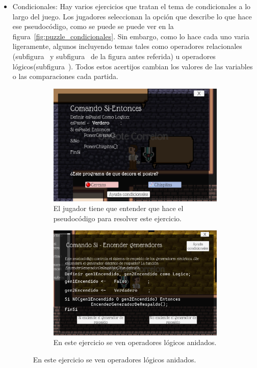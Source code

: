 \begin{itemize}
    \item Condicionales: Hay varios ejercicios que tratan el tema de condicionales a lo largo del juego. Los jugadores seleccionan la opción que describe lo que hace ese pseudocódigo, como se puede se puede ver en la figura~\ref{fig:puzzle_condicionales}. Sin embargo, como lo hace cada uno varia ligeramente, algunos incluyendo temas tales como operadores relacionales (subfigura~ y subfigura~ de la figura antes referida) u operadores lógicos(subfigura~). Todos estos acertijos cambian los valores de las variables o las comparaciones cada partida.
    \begin{figure}[H]
        \centering
        \caption{Capturas de pantalla de los diversos ejercicios de condicionales en el juego.}
        \label{fig:puzzle_condicionales}
        \begin{subfigure}{\textwidth}
            \centering
            \includegraphics[width=0.5\linewidth]{images/Puzzlecondicional1.png}
            \caption{El jugador tiene que entender que hace el pseudocódigo para resolver este ejercicio.}
            \label{fig:puzzle_condicionales1}
        \end{subfigure}
        \begin{subfigure}{\textwidth}
            \centering
            \includegraphics[width=0.5\linewidth]{images/Puzzlecondicional2.png}
            \caption{En este ejercicio se ven operadores lógicos anidados.}
            \label{fig:puzzle_condicionales2}
        \end{subfigure}
    \end{figure}

\end{itemize}
